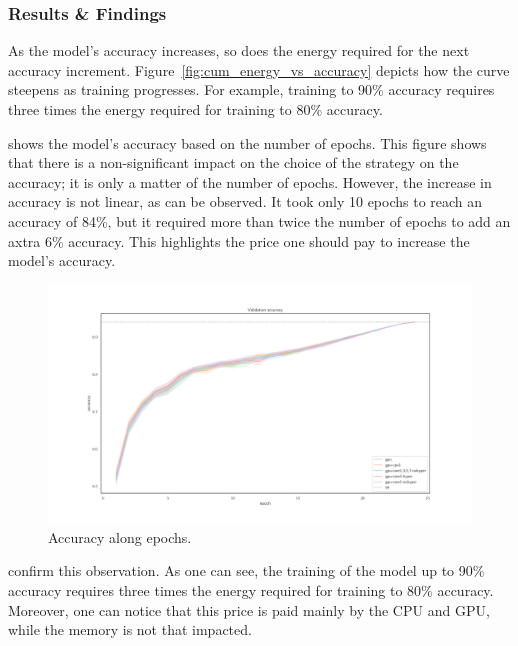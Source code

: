\subsubsection{Results \& Findings}
As the model's accuracy increases, so does the energy required for the next accuracy increment.
Figure~\ref{fig:cum_energy_vs_accuracy} depicts how the curve steepens as training progresses.
For example, training to 90\% accuracy requires three times the energy required for training to 80\% accuracy.

 shows the model's accuracy based on the number of epochs.
This figure shows that there is a non-significant impact on the choice of the strategy on the accuracy; it is only a matter of the number of epochs.
However, the increase in accuracy is not linear, as can be observed.
It took only 10 epochs to reach an accuracy of 84\%, but it required more than twice the number of epochs to add an axtra 6\% accuracy.
This highlights the price one should pay to increase the model's accuracy.

\begin{figure}
    \centering
    \includegraphics[width=1.1\textwidth]{imgs/accuracy_basedonepoch}
    \caption{Accuracy along epochs.}
    \label{fig:eopochvsaccuracy}
\end{figure}

 confirm this observation.
As one can see, the training of the model up to 90\% accuracy requires three times the energy required for training to 80\% accuracy.
Moreover, one can notice that this price is paid mainly by the CPU and GPU, while the memory is not that impacted.

